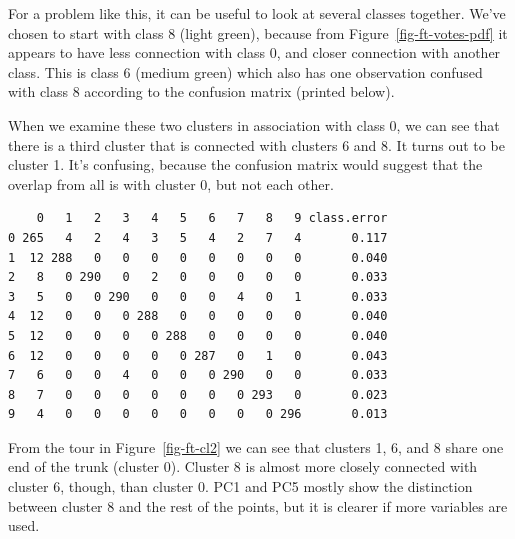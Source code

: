 \documentclass[
  letterpaper,
]{krantz}
\newenvironment{Shaded}{\begin{snugshade}}{\end{snugshade}}
\newcommand{\NormalTok}[1]{\textcolor[rgb]{0.00,0.23,0.31}{#1}}
\newcommand{\SpecialCharTok}[1]{\textcolor[rgb]{0.37,0.37,0.37}{#1}}
\begin{document}
For a problem like this, it can be useful to look at several classes
together. We've chosen to start with class 8 (light green), because from
Figure~\ref{fig-ft-votes-pdf} it appears to have less connection with
class 0, and closer connection with another class. This is class 6
(medium green) which also has one observation confused with class 8
according to the confusion matrix (printed below).

When we examine these two clusters in association with class 0, we can
see that there is a third cluster that is connected with clusters 6 and
8. It turns out to be cluster 1. It's confusing, because the confusion
matrix would suggest that the overlap from all is with cluster 0, but
not each other.

\begin{Shaded}
\end{Shaded}

\begin{verbatim}
    0   1   2   3   4   5   6   7   8   9 class.error
0 265   4   2   4   3   5   4   2   7   4       0.117
1  12 288   0   0   0   0   0   0   0   0       0.040
2   8   0 290   0   2   0   0   0   0   0       0.033
3   5   0   0 290   0   0   0   4   0   1       0.033
4  12   0   0   0 288   0   0   0   0   0       0.040
5  12   0   0   0   0 288   0   0   0   0       0.040
6  12   0   0   0   0   0 287   0   1   0       0.043
7   6   0   0   4   0   0   0 290   0   0       0.033
8   7   0   0   0   0   0   0   0 293   0       0.023
9   4   0   0   0   0   0   0   0   0 296       0.013
\end{verbatim}

From the tour in Figure~\ref{fig-ft-cl2} we can see that clusters 1, 6,
and 8 share one end of the trunk (cluster 0). Cluster 8 is almost more
closely connected with cluster 6, though, than cluster 0. PC1 and PC5
mostly show the distinction between cluster 8 and the rest of the
points, but it is clearer if more variables are used.
\end{document}
